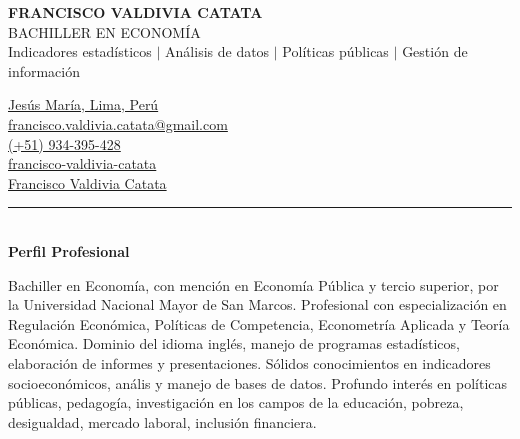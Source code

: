 \documentclass{resume}
\begin{document}
\noindent
\begin{minipage}{0.683\linewidth}
	\MakeUppercase{\LARGE \bf Francisco Valdivia Catata} \\
	\MakeUppercase{Bachiller en Economía} \\
	{\small Indicadores estadísticos $|$ Análisis de datos $|$ Políticas públicas $|$ Gestión de información}
\end{minipage}
\noindent
\begin{minipage}{0.317\textwidth}
	{\color{vino}\faMapMarker} {\href{https://www.google.com/maps/place/Jesús+María/@-12.0786039,-77.0600128,15z/data=!3m1!4b1!4m6!3m5!1s0x9105c8e3646ab8d7:0x848660d2fc40ce50!8m2!3d-12.0824947!4d-77.0506092!16zL20vMDd0Z2c4?entry=ttu}{Jesús María, Lima, Perú}} \\
	{\color{vino}\faEnvelopeSquare} {\href{mailto:francisco.valdivia.catata@gmail.com}{francisco.valdivia.catata@gmail.com}} \\
	{\color{vino}\faPhone} {\href{tel:934395428}{(+51) 934-395-428}} \\
	{\color{vino}\faLinkedinSquare} {\href{https://www.linkedin.com/in/francisco-valdivia-catata/}{francisco-valdivia-catata}}	\\
	{\color{vino}\faGithub} {\href{https://github.com/SrFerald}{Francisco Valdivia Catata}}
\end{minipage}
\vspace{-3pt}


{\color{vino} \noindent \rule{\textwidth}{1pt}} \\
{\color{vino} \noindent \faUser \; {\large \bf Perfil Profesional}}
\vspace{3pt}

\noindent Bachiller en Economía, con mención en Economía Pública y tercio superior, por la Universidad Nacional Mayor de San Marcos.
Profesional con especialización en Regulación Económica, Políticas de Competencia, Econometría Aplicada y Teoría Económica.
Dominio del idioma inglés, manejo de programas estadísticos, elaboración de informes y presentaciones.
Sólidos conocimientos en indicadores socioeconómicos, anális y manejo de bases de datos.
Profundo interés en políticas públicas, pedagogía, investigación en los campos de la educación, pobreza, desigualdad, mercado laboral, inclusión financiera.
\vspace{3pt}

\end{document}
